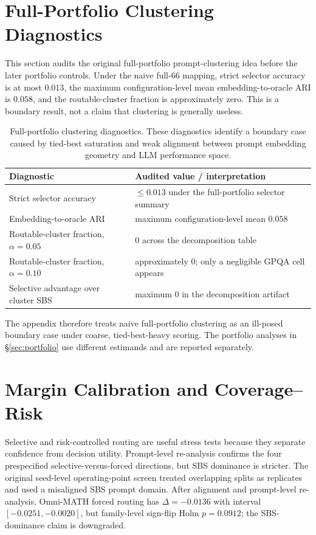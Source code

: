 \documentclass{article}
\begin{document}
\section{Full-Portfolio Clustering Diagnostics}
\label{app:tas008}

This section audits the original full-portfolio prompt-clustering idea before the later portfolio controls. Under the naive full-66 mapping, strict selector accuracy is at most $0.013$, the maximum configuration-level mean embedding-to-oracle ARI is $0.058$, and the routable-cluster fraction is approximately zero. This is a boundary result, not a claim that clustering is generally useless.

\begin{table}[h]
  \caption{Full-portfolio clustering diagnostics. These diagnostics identify a boundary case caused by tied-best saturation and weak alignment between prompt embedding geometry and LLM performance space.}
  \label{tab:app-full-cluster}
  \centering
  \small
  \begin{tabular}{ll}
    \toprule
    Diagnostic & Audited value / interpretation \\
    \midrule
    Strict selector accuracy & $\leq 0.013$ under the full-portfolio selector summary \\
    Embedding-to-oracle ARI & maximum configuration-level mean $0.058$ \\
    Routable-cluster fraction, $\alpha=0.05$ & $0$ across the decomposition table \\
    Routable-cluster fraction, $\alpha=0.10$ & approximately $0$; only a negligible GPQA cell appears \\
    Selective advantage over cluster SBS & maximum $0$ in the decomposition artifact \\
    \bottomrule
  \end{tabular}
\end{table}

The appendix therefore treats naive full-portfolio clustering as an ill-posed boundary case under coarse, tied-best-heavy scoring. The portfolio analyses in \S\ref{sec:portfolio} use different estimands and are reported separately.

\section{Margin Calibration and Coverage--Risk}
\label{app:task009a}

Selective and risk-controlled routing are useful stress tests because they separate confidence from decision utility. Prompt-level re-analysis confirms the four prespecified selective-versus-forced directions, but SBS dominance is stricter. The original seed-level operating-point screen treated overlapping splits as replicates and used a misaligned SBS prompt domain. After alignment and prompt-level re-analysis, Omni-MATH forced routing has $\Delta=-0.0136$ with interval $[-0.0251,-0.0020]$, but family-level sign-flip Holm $p=0.0912$; the SBS-dominance claim is downgraded.
\end{document}
